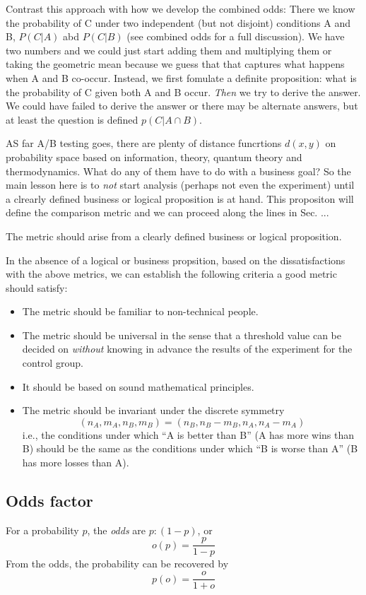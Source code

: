 \documentclass[12pt]{report}
\newcommand{\beq}{\begin{equation}} %
\newcommand{\eeq}{\end{equation}} %
\newcommand{\bdm}{\begin{displaymath}} %
\newcommand{\edm}{\end{displaymath}} %
\newcommand{\bi}{\begin{itemize}} %
\newcommand{\ei}{\end{itemize}} %
\begin{document}
Contrast this approach with how we develop the combined odds: There we know the probability of C under two independent (but not disjoint) conditions A and B, \(P(C|A)\) abd \(P(C|B)\) (see combined odds for a full discussion). We have two numbers and we could just start adding them and multiplying them or taking the geometric mean because we guess that that captures what happens when A and B co-occur. Instead, we first fomulate a definite proposition: what is the probability of C given both A and B occur. {\em Then} we try to derive the answer. We could have failed to derive the answer or there may be alternate answers, but at least the question is defined \(p(C|A\cap B)\).

AS far A/B testing goes, there are plenty of distance funcrtions \(d(x,y)\) on probability space based on information, theory, quantum theory and thermodynamics. What do any of them have to do with a business goal?
So the main lesson here is to {\em not} start analysis (perhaps not even the experiment) until a clrearly defined business or logical proposition is at hand. This propositon will define the comparison metric and we can proceed along the lines in Sec. ... 

The metric should arise from a clearly defined business or logical proposition.

In the absence of a logical or business propsition, based on the dissatisfactions with the above metrics, we can
establish the following criteria a good metric should satisfy:
\bi
  \item The metric should be familiar to non-technical people.
  \item The metric should be universal in the sense that a threshold
    value can be decided on {\em without} knowing in advance the
    results of the experiment for the control group.
  \item It should be based on sound mathematical principles.
  \item The metric should be invariant under the discrete symmetry
\bdm
(n_A, m_A, n_B, m_B) = (n_B, n_B - m_B, n_A, n_A - m_A)
\edm
i.e., the conditions under which ``A is better than B'' (A has more wins than B)
should be the same as the conditions under which ``B is worse than A''
(B has more losses than A).
\ei

\subsection{Odds factor}\label{sec:oddsfactor}
For a probability \(p\), the {\em odds} are \(p:(1-p)\), or
\beq\label{eq:oddsp}
o(p)=\frac{p}{1-p}
\eeq
From the odds, the probability can be recovered by
\beq\label{eq:podds}
p(o) = \frac{o}{1+o}
\eeq
\end{document}
